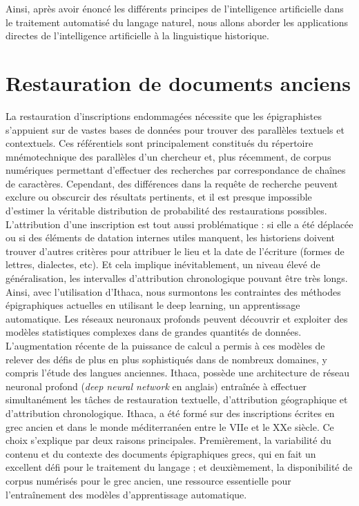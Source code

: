 \documentclass[12pt, french, twoside]{report}
\begin{document}
\indent Ainsi, après avoir énoncé les différents principes de l’intelligence artificielle dans le traitement automatisé du langage naturel, nous allons aborder les applications directes de l’intelligence artificielle à la linguistique historique.

\section{Restauration de documents anciens}
\indent La restauration d'inscriptions endommagées nécessite que les épigraphistes s'appuient sur de vastes bases de données pour trouver des parallèles textuels et contextuels. Ces référentiels sont principalement constitués du répertoire mnémotechnique des parallèles d'un chercheur et, plus récemment, de corpus numériques permettant d'effectuer des recherches par \og correspondance de chaînes de caractères\fg. Cependant, des différences dans la requête de recherche peuvent exclure ou obscurcir des résultats pertinents, et il est presque impossible d'estimer la véritable distribution de probabilité des restaurations possibles. L'attribution d'une inscription est tout aussi problématique : si elle a été déplacée ou si des éléments de datation internes utiles manquent, les historiens doivent trouver d'autres critères pour attribuer le lieu et la date de l'écriture (formes de lettres, dialectes, etc). Et cela implique inévitablement, un niveau élevé de généralisation, les intervalles d'attribution chronologique pouvant être très longs.\\

Ainsi, avec l'utilisation d'Ithaca, nous surmontons les contraintes des méthodes épigraphiques actuelles en utilisant le deep learning, un apprentissage automatique. Les réseaux neuronaux profonds peuvent découvrir et exploiter des modèles statistiques complexes dans de grandes quantités de données. L'augmentation récente de la puissance de calcul a permis à ces modèles de relever des défis de plus en plus sophistiqués dans de nombreux domaines, y compris l'étude des langues anciennes.
Ithaca, possède une architecture de réseau neuronal profond (\textit{deep neural network} en anglais) entraînée à effectuer simultanément les tâches de restauration textuelle, d'attribution géographique et d'attribution chronologique. Ithaca, a été formé sur des inscriptions écrites en grec ancien et dans le monde méditerranéen entre le VIIe et le XXe siècle. Ce choix s'explique par deux raisons principales. Premièrement, la variabilité du contenu et du contexte des documents épigraphiques grecs, qui en fait un excellent défi pour le traitement du langage ; et deuxièmement, la disponibilité de corpus numérisés pour le grec ancien, une ressource essentielle pour l'entraînement des modèles d'apprentissage automatique.\\
\end{document}

